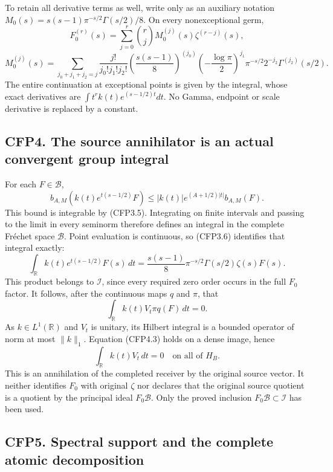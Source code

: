 To retain all derivative terms as well, write only as an auxiliary
notation \(M_0(s)=s(s-1)\pi^{-s/2}\Gamma(s/2)/8\). On every
nonexceptional germ, \[
F_0^{(r)}(s)=\sum_{j=0}^r\binom rj M_0^{(j)}(s)\zeta^{(r-j)}(s),
\] \[
M_0^{(j)}(s)=\sum_{j_0+j_1+j_2=j}
\frac{j!}{j_0!j_1!j_2!}
\left(\frac{s(s-1)}8\right)^{(j_0)}
\left(-\frac{\log\pi}2\right)^{j_1}\pi^{-s/2}
2^{-j_2}\Gamma^{(j_2)}(s/2).
\tag{CFP3.10}
\] The entire continuation at exceptional points is given by the
integral, whose exact derivatives are \(\int t^rk(t)e^{(s-1/2)t}dt\). No
Gamma, endpoint or scale derivative is replaced by a constant.

\subsection{CFP4. The source annihilator is an actual convergent group
integral}\label{cfp4.-the-source-annihilator-is-an-actual-convergent-group-integral}

For each \(F\in\mathcal B\), \[
b_{A,M}(k(t)e^{t(s-1/2)}F)
\le |k(t)|e^{(A+1/2)|t|}b_{A,M}(F).
\tag{CFP4.1}
\] This bound is integrable by (CFP3.5). Integrating on finite intervals
and passing to the limit in every seminorm therefore defines an integral
in the complete Fréchet space \(\mathcal B\). Point evaluation is
continuous, so (CFP3.6) identifies that integral exactly: \[
\int_{\mathbb R} k(t)e^{t(s-1/2)}F(s)\,dt
=\frac{s(s-1)}8\pi^{-s/2}\Gamma(s/2)\zeta(s)F(s).
\tag{CFP4.2}
\] This product belongs to \(\mathcal I\), since every required zero
order occurs in the full \(F_0\) factor. It follows, after the
continuous maps \(q\) and \(\pi\), that \[
\int_{\mathbb R}k(t)V_t\pi q(F)\,dt=0.
\tag{CFP4.3}
\] As \(k\in L^1(\mathbb R)\) and \(V_t\) is unitary, its Hilbert
integral is a bounded operator of norm at most \(\|k\|_1\). Equation
(CFP4.3) holds on a dense image, hence \[
\boxed{\int_{\mathbb R}k(t)V_t\,dt=0\quad\text{on all of }H_B.}
\tag{CFP4.4}
\] This is an annihilation of the completed receiver by the original
source vector. It neither identifies \(F_0\) with original \(\zeta\) nor
declares that the original source quotient is a quotient by the
principal ideal \(F_0\mathcal B\). Only the proved inclusion
\(F_0\mathcal B\subset\mathcal I\) has been used.

\subsection{CFP5. Spectral support and the complete atomic
decomposition}\label{cfp5.-spectral-support-and-the-complete-atomic-decomposition}

